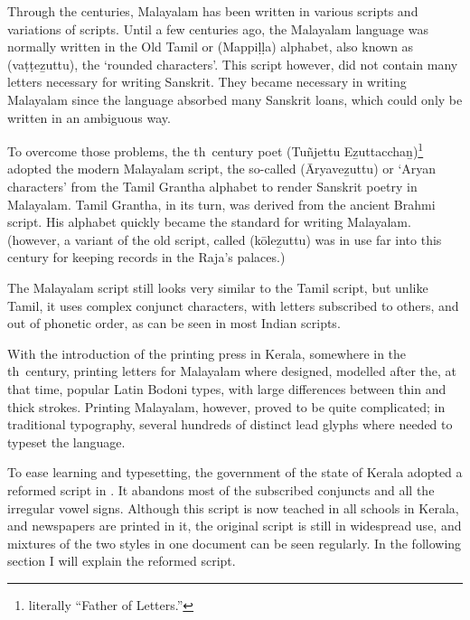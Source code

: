 Through the centuries, Malayalam has been written in various scripts 
and variations of scripts. Until a few centuries ago, the Malayalam 
language was normally written in the Old Tamil or {\mm {}} 
({\mmtr Mappi\d l\d la}) alphabet, also known as {\mm {}} 
({\mmtr va\d t\d te\b zuttu}), the `rounded characters'. This script however, did 
not contain many letters necessary for writing Sanskrit. They became 
necessary in writing Malayalam since the language absorbed many 
Sanskrit loans, which could only be written in an ambiguous way.

To overcome those problems, the {}th~century poet {\mm {} 
} ({\mmtr Tu\~njettu E\b zuttaccha\b n})\footnote*{literally 
``Father of Letters.''} adopted the modern Malayalam script, the
so-called {\mm {}} ({\mmtr \=Aryave\b zuttu}) or `Aryan characters' 
from the Tamil Grantha alphabet to render Sanskrit poetry in 
Malayalam. Tamil Grantha, in its turn, was derived from the ancient 
Brahmi script. His alphabet quickly became the standard for writing 
Malayalam. (however, a variant of the old script, called {\mm {}} 
({\mmtr k\=ole\b zuttu}) was in use far into this century for keeping records 
in the Raja's palaces.)

The Malayalam script still looks very similar to the Tamil script, but 
unlike Tamil, it uses complex conjunct characters, with letters 
subscribed to others, and out of phonetic order, as can be seen in 
most Indian scripts.

With the introduction of the printing press in Kerala, somewhere in 
the {}th~century, printing letters for Malayalam where designed, 
modelled after the, at that time, popular Latin Bodoni types, with 
large differences between thin and thick strokes. Printing Malayalam, 
however, proved to be quite complicated; in traditional typography, 
several hundreds of distinct lead glyphs where needed to typeset the 
language.

To ease learning and typesetting, the government of the state of 
Kerala adopted a reformed script in {}. It abandons most of the 
subscribed conjuncts and all the irregular vowel signs. Although this 
script is now teached in all schools in Kerala, and newspapers are 
printed in it, the original script is still in widespread use, and 
mixtures of the two styles in one document can be seen regularly. In 
the following section I will explain the reformed script.

